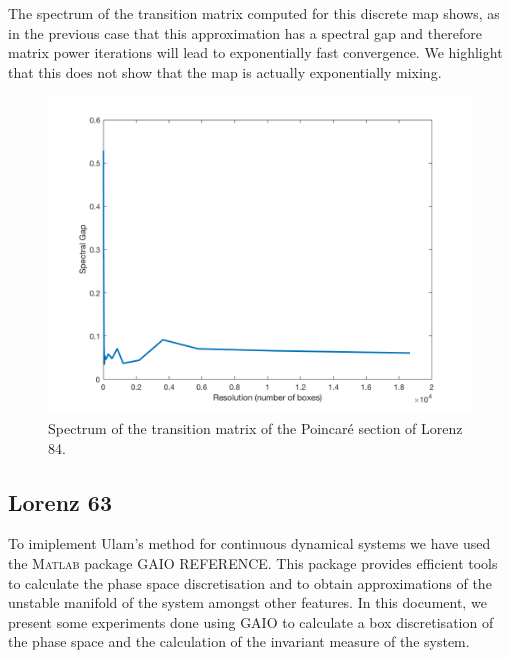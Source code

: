 The spectrum of the transition matrix computed for this discrete map shows, as in the previous case that this approximation has a spectral gap and therefore matrix power iterations will lead to exponentially fast convergence. We highlight that this does not show that the map is actually exponentially mixing.

\begin{figure}[H]
	\centering
	\includegraphics[scale=0.2]{spectruml84.png}
	\caption{Spectrum of the transition matrix of the Poincar\'{e} section of Lorenz 84.}
\end{figure}


\subsection{Lorenz 63}

To imiplement Ulam's method for continuous dynamical systems we have used the \textsc{Matlab}\xspace package GAIO REFERENCE. This package provides efficient tools to calculate the phase space discretisation and to obtain approximations of the unstable manifold of the system amongst other features. In this document, we present some experiments done using GAIO to calculate a box discretisation of the phase space and the calculation of the invariant measure of the system.

